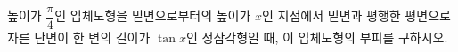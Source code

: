 \hspace*{2mm}\begin{minipage}[t]{\dimexpr\linewidth-2mm\relax}\vspace{0pt}
높이가 $\dfrac{\pi}{4}$인 입체도형을 밑면으로부터의 높이가 $x$인 지점에서 밑면과 평행한 평면으로 자른 단면이 한 변의 길이가 $\tan x$인 정삼각형일 때, 이 입체도형의 부피를 구하시오.\end{minipage}
